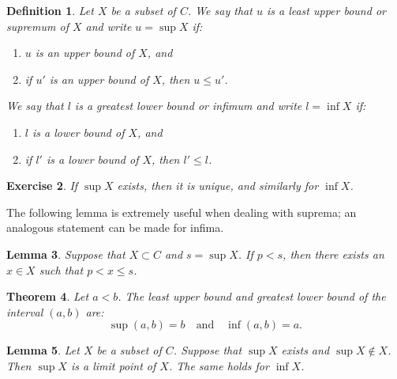 \documentclass{amsart}
\newtheorem{theorem}{Theorem}
\newtheorem{lemma}[theorem]{Lemma}
\newtheorem{definition}[theorem]{Definition}
\newtheorem{exercise}[theorem]{Exercise}
\newcommand{\1}{\mathds{1}}
\numberwithin{equation}{section}
\numberwithin{theorem}{section}
\begin{document}
\begin{definition}  Let $X$ be a subset of $C$.  We say that $u$ is a \emph{least upper bound} or {\em supremum} of $X$ and write $u = \sup X$ if:
\begin{enumerate}
\item  $u$ is an upper bound of $X$, and
\item  if $u'$ is an upper bound of $X$, then $u \leq u'$.
\end{enumerate}
We say that $l$ is a \emph{greatest lower bound} or {\em infimum} and write $l = \inf X$ if:
\begin{enumerate}
\item $l$ is a lower bound of $X$, and
\item if $l'$ is a lower bound of $X$, then $l' \leq l$.
\end{enumerate}
\end{definition}


\begin{exercise}  If $\sup X$ exists, then it is unique, and similarly for $\inf X$.
\end{exercise}







The following lemma is extremely useful when dealing with suprema; an analogous statement can be made for infima.
\begin{lemma} 
\label{lem1}
Suppose that $X \subset C$ and $s = \sup X$.
If $p<s$, then there exists an $x\in X$ such that $p < x \le s$.
\end{lemma} 


\begin{theorem}  Let $a < b$.  The least upper bound and greatest lower bound of the interval $(a,b)$ are:
\[
\sup (a,b) = b \quad \text{and} \quad \inf (a,b) = a.
\]
\end{theorem}




\begin{lemma}  
Let $X$ be a subset of $C$.
Suppose that $\sup X$ exists and $\sup X \notin X$.  Then $\sup X$ is a limit point of $X$.  The same holds for $\inf X$.
\end{lemma} 
\end{document}
